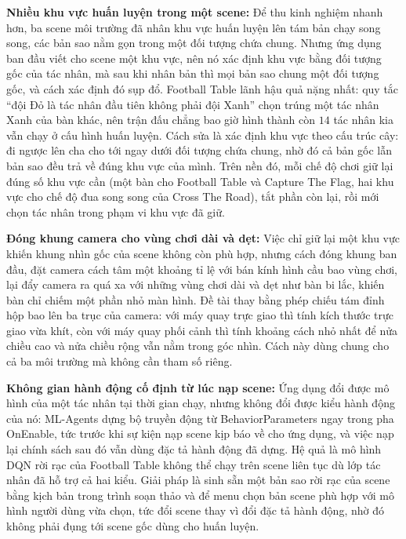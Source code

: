 \indent \textbf{Nhiều khu vực huấn luyện trong một scene:} Để thu kinh nghiệm nhanh hơn,
ba scene môi trường đã nhân khu vực huấn luyện lên tám bản chạy song song, các bản sao nằm
gọn trong một đối tượng chứa chung. Nhưng ứng dụng ban đầu viết cho scene một khu vực, nên
nó xác định khu vực bằng đối tượng gốc của tác nhân, mà sau khi nhân bản thì mọi bản sao
chung một đối tượng gốc, và cách xác định đó sụp đổ. Football Table lãnh hậu quả nặng
nhất: quy tắc ``đội Đỏ là tác nhân đầu tiên không phải đội Xanh'' chọn trúng một tác nhân
Xanh của bàn khác, nên trận đấu chẳng bao giờ hình thành còn $14$ tác nhân kia vẫn chạy ở cấu
hình huấn luyện. Cách sửa là xác định khu vực theo cấu trúc cây: đi ngược lên
cha cho tới ngay dưới đối tượng chứa chung, nhờ đó cả bản gốc lẫn bản sao đều trả về đúng
khu vực của mình. Trên nền đó, mỗi chế độ chơi giữ lại đúng số khu vực cần (một bàn cho
Football Table và Capture The Flag, hai khu vực cho chế độ đua song song của Cross The Road),
tắt phần còn lại, rồi mới chọn tác nhân trong phạm vi khu vực đã giữ.

\indent \textbf{Đóng khung camera cho vùng chơi dài và dẹt:} Việc chỉ giữ lại một khu
vực khiến khung nhìn gốc của scene không còn phù hợp, nhưng cách đóng khung ban đầu, đặt
camera cách tâm một khoảng tỉ lệ với bán kính hình cầu bao vùng chơi, lại đẩy camera ra quá xa
với những vùng chơi dài và dẹt như bàn bi lắc, khiến bàn chỉ chiếm
một phần nhỏ màn hình. Đề tài thay bằng phép chiếu tám đỉnh hộp bao lên ba trục của
camera: với máy quay trực giao thì tính kích thước trực giao vừa khít, còn với máy quay
phối cảnh thì tính khoảng cách nhỏ nhất để nửa chiều cao và nửa chiều rộng vẫn nằm
trong góc nhìn. Cách này dùng chung cho cả ba môi trường mà không cần tham số riêng.

\indent \textbf{Không gian hành động cố định từ lúc nạp scene:} Ứng dụng đổi được mô
hình của một tác nhân tại thời gian chạy, nhưng không đổi được kiểu hành động
của nó: ML-Agents dựng bộ truyền động từ BehaviorParameters ngay trong pha
OnEnable, tức trước khi sự kiện nạp scene kịp báo về cho ứng dụng, và việc nạp
lại chính sách sau đó vẫn dùng đặc tả hành động đã dựng. Hệ quả là mô hình DQN rời rạc
của Football Table không thể chạy trên scene liên tục dù lớp tác nhân đã hỗ trợ cả hai
kiểu. Giải pháp là sinh sẵn một bản sao rời rạc của scene bằng kịch bản trong trình
soạn thảo và để menu chọn bản scene phù hợp với mô hình người dùng vừa chọn, tức đổi scene
thay vì đổi đặc tả hành động, nhờ đó không phải đụng tới scene gốc dùng cho huấn luyện.

